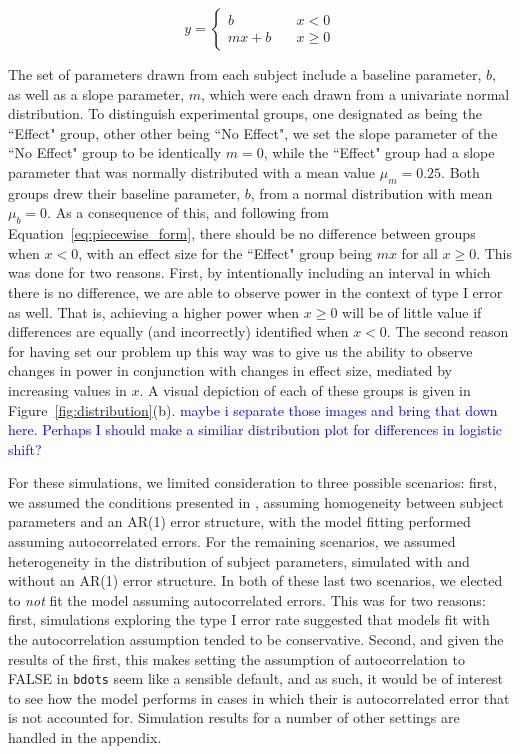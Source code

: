 \documentclass{article}
\newcommand{\xt}{\texttt}
\providecommand{\cn}[1]{\textcolor{blue}{#1}}
\begin{document}
\begin{equation}\label{eq:piecewise_form}
y = \begin{cases}
b \quad &x < 0 \\
mx + b \quad &x \geq 0
\end{cases}
\end{equation}

The set of parameters drawn from each subject include a baseline parameter, $b$, as well as a slope parameter, $m$, which were each drawn from a univariate normal distribution. To distinguish experimental groups, one designated as being the ``Effect" group, other other being ``No Effect", we set the slope parameter of the ``No Effect" group to be identically $m = 0$, while the ``Effect" group had a slope parameter that was normally distributed with a mean value $\mu_m = 0.25$. Both groups drew their baseline parameter, $b$, from a normal distribution with mean $\mu_b = 0$. As a consequence of this, and following from Equation~\ref{eq:piecewise_form}, there should be no difference between groups when $x < 0$, with an effect size for the ``Effect" group being $mx$ for all $x \geq 0$. This was done for two reasons. First, by intentionally including an interval in which there is no difference, we are able to observe power in the context of type I error as well. That is, achieving a higher power when $x \geq 0$ will be of little value if differences are equally (and incorrectly) identified when $x < 0$. The second reason for having set our problem up this way was to give us the ability to observe changes in power in conjunction with changes in effect size, mediated by increasing values in $x$. A visual depiction of each of these groups is given in Figure~\ref{fig:distribution}(b). \cn{maybe i separate those images and bring that down here. Perhaps I should make a similiar distribution plot for differences in logistic shift?}


For these simulations, we limited consideration to three possible scenarios: first, we assumed the conditions presented in \citet{oleson2017detecting}, assuming homogeneity between subject parameters and an AR(1) error structure, with the model fitting performed assuming autocorrelated errors. For the remaining scenarios, we assumed heterogeneity in the distribution of subject parameters, simulated with and without an AR(1) error structure. In both of these last two scenarios, we elected to \textit{not} fit the model assuming autocorrelated errors. This was for two reasons: first, simulations exploring the type I error rate suggested that models fit with the autocorrelation assumption tended to be conservative. Second, and given the results of the first, this makes setting the assumption of autocorrelation to FALSE in \xt{bdots} seem like a sensible default, and as such, it would be of interest to see how the model performs in cases in which their is autocorrelated error that is not accounted for. Simulation results for a number of other settings are handled in the appendix. 
\end{document}
